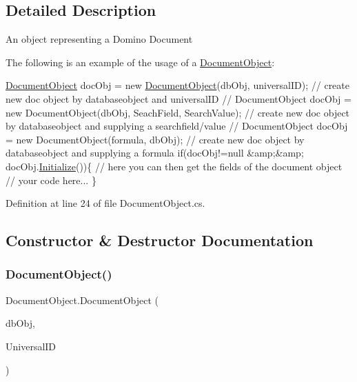 \subsection{Detailed Description}
An object representing a Domino Document 

The following is an example of the usage of a {\ttfamily \mbox{\hyperlink{class_document_object}{Document\+Object}}}\+: 
\begin{DoxyCode}
\mbox{\hyperlink{class_document_object}{DocumentObject}} docObj = \textcolor{keyword}{new} \mbox{\hyperlink{class_document_object_a46c89e7d40b15a91542a5482b2d8a084}{DocumentObject}}(dbObj, universalID); \textcolor{comment}{// create new
       doc object by databaseobject and universalID}
\textcolor{comment}{// DocumentObject docObj = new DocumentObject(dbObj, SeachField, SearchValue); // create new doc object by
       databaseobject and supplying a searchfield/value}
\textcolor{comment}{// DocumentObject docObj = new DocumentObject(formula, dbObj); // create new doc object by databaseobject
       and supplying a formula}
\textcolor{keywordflow}{if}(docObj!=null &amp;&amp; docObj.\mbox{\hyperlink{class_document_object_af4298d6cfbb9ea60643d9995309b73f1}{Initialize}}())\{
     \textcolor{comment}{// here you can then get the fields of the document object}
     \textcolor{comment}{// your code here... }
\}
\end{DoxyCode}
 

Definition at line 24 of file Document\+Object.\+cs.



\subsection{Constructor \& Destructor Documentation}
\mbox{\label{class_document_object_a46c89e7d40b15a91542a5482b2d8a084}} 
\subsubsection{\texorpdfstring{Document\+Object()}{DocumentObject()}\hspace{0.1cm}{\footnotesize\ttfamily [1/3]}}
{\footnotesize\ttfamily Document\+Object.\+Document\+Object (\begin{DoxyParamCaption}\item[{\mbox{\hyperlink{class_database_object}{Database\+Object}}}]{db\+Obj,  }\item[{String}]{Universal\+ID }\end{DoxyParamCaption})}



